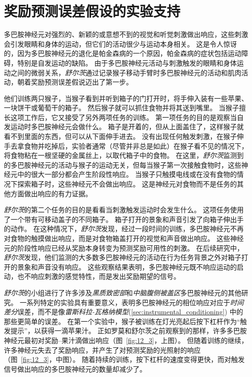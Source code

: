 \section{奖励预测误差假设的实验支持} \label{sec:experimental_support}

多巴胺神经元对强烈的、新颖的或意想不到的视觉和听觉刺激做出响应，这些刺激会引发眼睛和身体的运动，但它们的活动很少与运动本身相关。
这是令人惊讶的，因为多巴胺神经元的退化是帕金森病的一个原因，帕金森病的症状包括运动障碍，特别是自发运动的缺陷。
由于多巴胺神经元活动与刺激触发的眼睛和身体运动之间的微弱关系，\textit{舒尔茨}\cite{romo1990dopamine,schultz1990dopamine}通过记录猴子移动手臂时多巴胺神经元的活动和肌肉活动，朝着奖励预测误差假说迈出了第一步。


他们训练两只猴子，当猴子看到并听到箱子的门打开时，将手伸入装有一些苹果、一块饼干或葡萄干的箱子。
然后猴子就可以抓住食物并将其送到嘴里。
当猴子擅长这项工作后，它又接受了另外两项任务的训练。
第一项任务的目的是观察当自发运动时多巴胺神经元会做什么。
箱子是开着的，但从上面盖住了，这样猴子就看不到里面的东西，但可以从下面伸手进去。
没有出现任何触发刺激，在猴子伸手去拿食物并吃掉后，实验者通常（尽管并非总是如此）在猴子看不见的情况下，将食物粘在一根坚硬的金属丝上，以取代箱子中的食物。
在这里，\textit{舒尔茨}监测到的多巴胺神经元的活动与猴子的运动无关，但每当猴子第一次接触食物时，这些神经元中的很大一部分都会产生阶段性响应。
当猴子只触摸电线或在没有食物的情况下探索箱子时，这些神经元不会做出响应。
这是神经元对食物而不是任务的其他方面做出响应的有力证据。


\textit{舒尔茨}的第二个任务的目的是看看当刺激触发运动时会发生什么。
这项任务使用了一个带有可移动盖子的不同箱子。
箱子打开的景象和声音引发了向箱子伸出手的动作。
在这种情况下，\textit{舒尔茨}发现，经过一段时间的训练，多巴胺神经元不再对食物的触摸做出响应，而是对食物箱盖打开的视觉和声音做出响应。
这些神经元的阶段性响应已经从奖励本身转变为预测奖励可用性的刺激。
在后续研究中，\textit{舒尔茨}发现，他们监测的大多数多巴胺神经元的活动在行为任务背景之外对箱子打开的景象和声音没有响应。
这些观察结果表明，多巴胺神经元既不响应运动的启动，也不响应刺激的感觉特性，而是发出奖励期望的信号。


\textit{舒尔茨}的小组进行了许多涉及\textit{黑质致密部}和\textit{中脑腹侧被盖区}多巴胺神经元的其他研究。
一系列特定的实验具有重要意义，表明多巴胺神经元的相位响应对应于\textit{时间差分}误差，而不是像\textit{雷斯科拉-瓦格纳模型}(\ref{sec:instrumental_conditioning}) 中的那些更简单的误差。
在第一个实验中\cite{ljungberg1992responses}，猴子被训练在灯光亮起后按下杠杆作为“触发提示”，以获得一滴苹果汁。
正如罗莫和舒尔茨之前观察到的那样，许多多巴胺神经元最初对奖励--果汁滴做出响应（图~\ref{fig:12_3}，上图）。
但随着训练的继续，许多神经元失去了奖励响应，并产生了对预测奖励的光照射的响应（图~\ref{fig:12_3}，中图）。
随着持续的训练，按下杠杆的速度变得更快，而对触发信号做出响应的多巴胺神经元的数量却减少了。


